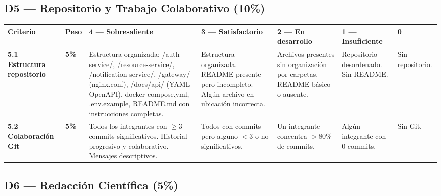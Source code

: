 \documentclass[11pt,a4paper,landscape]{article}
\begin{document}
	\vspace{6pt}
	
	\subsection{D5 --- Repositorio y Trabajo Colaborativo (10\%)}
	
	\begin{center}
		\footnotesize
		\begin{tabular}{|P{2.2cm}|C{1cm}|L{8.2cm}|L{3.8cm}|L{3.8cm}|L{3cm}|L{2cm}|}
			\hline
			\color{white}\textbf{Criterio} & \color{white}\textbf{Peso} &
			\color{white}\textbf{4 --- Sobresaliente} &
			\color{white}\textbf{3 --- Satisfactorio} &
			\color{white}\textbf{2 --- En desarrollo} &
			\color{white}\textbf{1 --- Insuficiente} &
			\color{white}\textbf{0}\\
			\hline
			
			\textbf{5.1 Estructura repositorio} &
			\textbf{5\%} &
			Estructura organizada: /auth-service/, /resource-service/, /notification-service/, /gateway/ (nginx.conf), /docs/api/ (YAML OpenAPI), docker-compose.yml, .env.example, README.md con instrucciones completas. &
			Estructura organizada. README presente pero incompleto. Alg\'un archivo en ubicaci\'on incorrecta. &
			Archivos presentes sin organizaci\'on por carpetas. README b\'asico o ausente. &
			Repositorio desordenado. Sin README. &
			Sin repositorio.\\
			\hline
			
			\textbf{5.2 Colaboraci\'on Git} &
			\textbf{5\%} &
			Todos los integrantes con $\geq$3 commits significativos. Historial progresivo y colaborativo. Mensajes descriptivos. &
			Todos con commits pero alguno $<$3 o no significativos. &
			Un integrante concentra $>$80\% de commits. &
			Alg\'un integrante con 0 commits. &
			Sin Git.\\
			\hline
		\end{tabular}
	\end{center}
	
	\vspace{6pt}
	
	\subsection{D6 --- Redacci\'on Cient\'ifica (5\%)}
	
\end{document}

